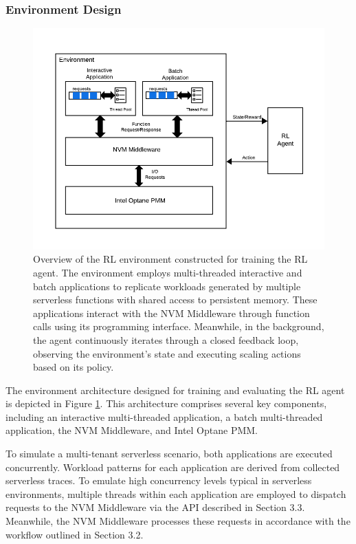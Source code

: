 \subsubsection{Environment Design}

\begin{figure}[ht]
  \centering
  \includegraphics[width=1\textwidth]{images/rl_environment_architecture.png}
  \caption[Overview of the Reinforcement Learning Environment]{Overview of the RL environment constructed for training the RL agent. The environment employs multi-threaded interactive and batch applications to replicate workloads generated by multiple serverless functions with shared access to persistent memory. These applications interact with the NVM Middleware through function calls using its programming interface. Meanwhile, in the background, the agent continuously iterates through a closed feedback loop, observing the environment's state and executing scaling actions based on its policy.}
  \label{fig:rl_environment_architecture}
\end{figure}

The environment architecture designed for training and evaluating the RL agent is depicted in Figure \ref{fig:rl_environment_architecture}. This architecture comprises several key components, including an interactive multi-threaded application, a batch multi-threaded application, the NVM Middleware, and Intel Optane PMM.

To simulate a multi-tenant serverless scenario, both applications are executed concurrently. Workload patterns for each application are derived from collected serverless traces. To emulate high concurrency levels typical in serverless environments, multiple threads within each application are employed to dispatch requests to the NVM Middleware via the API described in Section 3.3. Meanwhile, the NVM Middleware processes these requests in accordance with the workflow outlined in Section 3.2.

